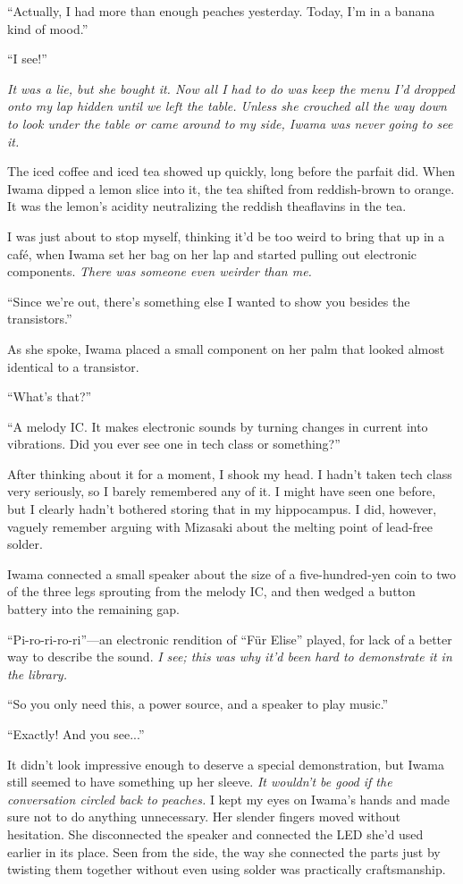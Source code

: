 \documentclass[
    a4paper,
    12pt,
    twoside,
    openany,
    UTF8,
    fontset=windows
]{ctexbook}
\begin{document}
``Actually, I had more than enough peaches yesterday. Today, I'm in a banana kind of mood.''

``I see!''

\textit{It was a lie, but she bought it. Now all I had to do was keep the menu I'd dropped onto my lap hidden until we left the table. Unless she crouched all the way down to look under the table or came around to my side, Iwama was never going to see it.}

The iced coffee and iced tea showed up quickly, long before the parfait did. When Iwama dipped a lemon slice into it, the tea shifted from reddish-brown to orange. It was the lemon's acidity neutralizing the reddish theaflavins in the tea.

I was just about to stop myself, thinking it'd be too weird to bring that up in a café, when Iwama set her bag on her lap and started pulling out electronic components. \textit{There was someone even weirder than me.}

``Since we're out, there's something else I wanted to show you besides the transistors.''

As she spoke, Iwama placed a small component on her palm that looked almost identical to a transistor.

``What's that?''

``A melody IC. It makes electronic sounds by turning changes in current into vibrations. Did you ever see one in tech class or something?''

After thinking about it for a moment, I shook my head. I hadn't taken tech class very seriously, so I barely remembered any of it. I might have seen one before, but I clearly hadn't bothered storing that in my hippocampus. I did, however, vaguely remember arguing with Mizasaki about the melting point of lead-free solder.

Iwama connected a small speaker about the size of a five-hundred-yen coin to two of the three legs sprouting from the melody IC, and then wedged a button battery into the remaining gap.

``Pi-ro-ri-ro-ri''---an electronic rendition of ``Für Elise'' played, for lack of a better way to describe the sound. \textit{I see; this was why it'd been hard to demonstrate it in the library.}

``So you only need this, a power source, and a speaker to play music.''

``Exactly! And you see...''

It didn't look impressive enough to deserve a special demonstration, but Iwama still seemed to have something up her sleeve. \textit{It wouldn't be good if the conversation circled back to peaches.} I kept my eyes on Iwama's hands and made sure not to do anything unnecessary. Her slender fingers moved without hesitation. She disconnected the speaker and connected the LED she'd used earlier in its place. Seen from the side, the way she connected the parts just by twisting them together without even using solder was practically craftsmanship.
\end{document}
